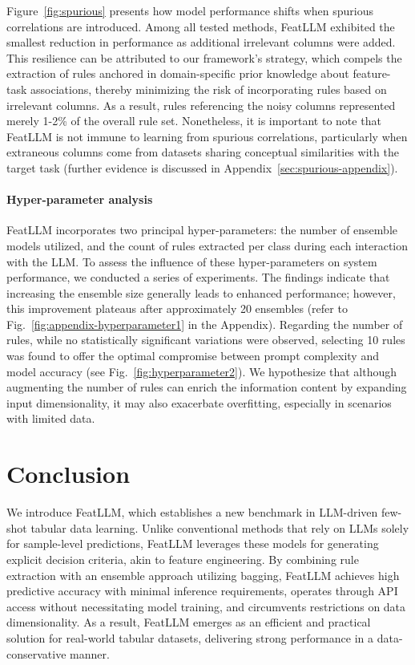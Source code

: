 Figure~\ref{fig:spurious} presents how model performance shifts when spurious correlations are introduced. Among all tested methods, \textsf{FeatLLM} exhibited the smallest reduction in performance as additional irrelevant columns were added. This resilience can be attributed to our framework’s strategy, which compels the extraction of rules anchored in domain-specific prior knowledge about feature-task associations, thereby minimizing the risk of incorporating rules based on irrelevant columns. As a result, rules referencing the noisy columns represented merely 1-2\% of the overall rule set. Nonetheless, it is important to note that \textsf{FeatLLM} is not immune to learning from spurious correlations, particularly when extraneous columns come from datasets sharing conceptual similarities with the target task (further evidence is discussed in Appendix~\ref{sec:spurious-appendix}).

\vspace*{-0.12in}
\paragraph{Hyper-parameter analysis}
\textsf{FeatLLM} incorporates two principal hyper-parameters: the number of ensemble models utilized, and the count of rules extracted per class during each interaction with the LLM. To assess the influence of these hyper-parameters on system performance, we conducted a series of experiments. The findings indicate that increasing the ensemble size generally leads to enhanced performance; however, this improvement plateaus after approximately 20 ensembles (refer to Fig.~\ref{fig:appendix-hyperparameter1} in the Appendix). Regarding the number of rules, while no statistically significant variations were observed, selecting 10 rules was found to offer the optimal compromise between prompt complexity and model accuracy (see Fig.~\ref{fig:hyperparameter2}). We hypothesize that although augmenting the number of rules can enrich the information content by expanding input dimensionality, it may also exacerbate overfitting, especially in scenarios with limited data.

\section{Conclusion}
We introduce \textsf{FeatLLM}, which establishes a new benchmark in LLM-driven few-shot tabular data learning. Unlike conventional methods that rely on LLMs solely for sample-level predictions, \textsf{FeatLLM} leverages these models for generating explicit decision criteria, akin to feature engineering. By combining rule extraction with an ensemble approach utilizing bagging, \textsf{FeatLLM} achieves high predictive accuracy with minimal inference requirements, operates through API access without necessitating model training, and circumvents restrictions on data dimensionality. As a result, \textsf{FeatLLM} emerges as an efficient and practical solution for real-world tabular datasets, delivering strong performance in a data-conservative manner.

